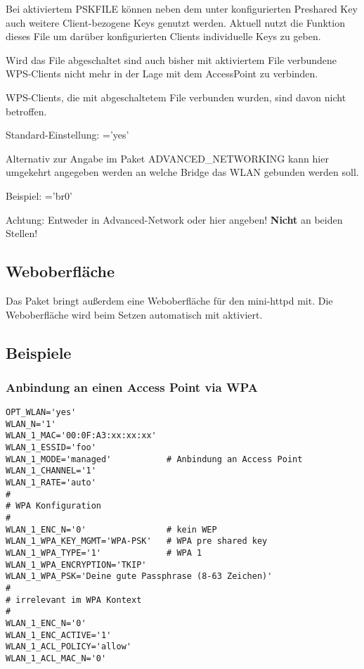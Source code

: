 \begin{description}

        Bei aktiviertem PSKFILE können neben dem unter 
        konfigurierten Preshared Key auch weitere Client-bezogene Keys genutzt werden.
        Aktuell nutzt die Funktion  dieses File um darüber
        konfigurierten Clients individuelle Keys zu geben.

        Wird das File abgeschaltet sind auch bisher mit aktiviertem File verbundene
        WPS-Clients nicht mehr in der Lage mit dem AccessPoint zu verbinden.

        WPS-Clients, die mit abgeschaltetem File verbunden wurden, sind davon nicht
        betroffen.

        Standard-Einstellung: ='yes'


        Alternativ zur Angabe im Paket ADVANCED\_NETWORKING kann hier umgekehrt
        angegeben werden an welche Bridge das WLAN gebunden werden soll.

        Beispiel: ='br0'

        Achtung: Entweder in Advanced-Network oder hier angeben! \textbf{Nicht} an beiden Stellen!

\end{description}

\subsection{Weboberfläche}

    Das Paket bringt außerdem eine Weboberfläche für den mini-httpd mit.
    Die Weboberfläche wird beim Setzen  
    automatisch mit aktiviert.
    

\subsection{Beispiele}
\subsubsection{Anbindung an einen Access Point via WPA}

\begin{example}
\begin{verbatim}
OPT_WLAN='yes'
WLAN_N='1'
WLAN_1_MAC='00:0F:A3:xx:xx:xx'
WLAN_1_ESSID='foo'
WLAN_1_MODE='managed'           # Anbindung an Access Point
WLAN_1_CHANNEL='1'
WLAN_1_RATE='auto'
#
# WPA Konfiguration
#
WLAN_1_ENC_N='0'                # kein WEP
WLAN_1_WPA_KEY_MGMT='WPA-PSK'   # WPA pre shared key
WLAN_1_WPA_TYPE='1'             # WPA 1
WLAN_1_WPA_ENCRYPTION='TKIP'
WLAN_1_WPA_PSK='Deine gute Passphrase (8-63 Zeichen)'
#
# irrelevant im WPA Kontext
#
WLAN_1_ENC_N='0'
WLAN_1_ENC_ACTIVE='1'
WLAN_1_ACL_POLICY='allow'
WLAN_1_ACL_MAC_N='0'
\end{verbatim}
\end{example}

